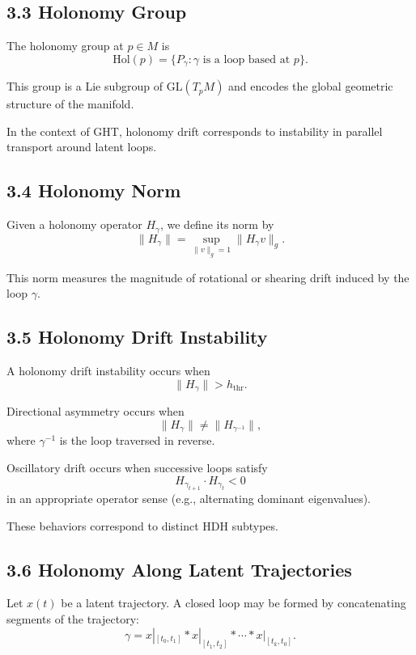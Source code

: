 \subsection*{3.3 Holonomy Group}

The holonomy group at $p \in M$ is
\[
\mathrm{Hol}(p)
= \{ P_\gamma : \gamma \text{ is a loop based at } p \}.
\]

This group is a Lie subgroup of $\mathrm{GL}(T_p M)$ and encodes the
global geometric structure of the manifold.

In the context of GHT, holonomy drift corresponds to instability in
parallel transport around latent loops.

\subsection*{3.4 Holonomy Norm}

Given a holonomy operator $H_\gamma$, we define its norm by
\[
\|H_\gamma\| = \sup_{\|v\|_g = 1} \|H_\gamma v\|_g.
\]

This norm measures the magnitude of rotational or shearing drift induced
by the loop $\gamma$.

\subsection*{3.5 Holonomy Drift Instability}

A holonomy drift instability occurs when
\[
\|H_\gamma\| > h_{\mathrm{thr}}.
\]

Directional asymmetry occurs when
\[
\|H_\gamma\| \neq \|H_{\gamma^{-1}}\|,
\]
where $\gamma^{-1}$ is the loop traversed in reverse.

Oscillatory drift occurs when successive loops satisfy
\[
H_{\gamma_{t+1}} \cdot H_{\gamma_t} < 0
\]
in an appropriate operator sense (e.g., alternating dominant eigenvalues).

These behaviors correspond to distinct HDH subtypes.

\subsection*{3.6 Holonomy Along Latent Trajectories}

Let $x(t)$ be a latent trajectory. A closed loop may be formed by
concatenating segments of the trajectory:
\[
\gamma = x|_{[t_0,t_1]} \ast x|_{[t_1,t_2]} \ast \cdots \ast x|_{[t_k,t_0]}.
\]

